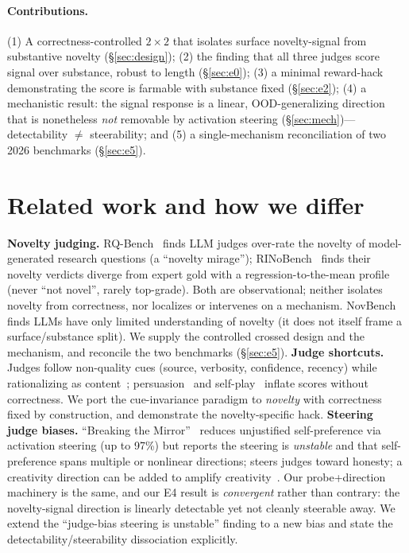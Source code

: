 \documentclass[11pt]{article}
\begin{document}
\paragraph{Contributions.} (1) A correctness-controlled $2\times2$ that isolates
surface novelty-signal from substantive novelty (\S\ref{sec:design}); (2) the
finding that all three judges score signal over substance, robust to length
(\S\ref{sec:e0}); (3) a minimal reward-hack demonstrating the score is farmable
with substance fixed (\S\ref{sec:e2}); (4) a mechanistic result: the signal
response is a linear, OOD-generalizing direction that is nonetheless \emph{not}
removable by activation steering (\S\ref{sec:mech})---detectability $\neq$
steerability; and (5) a single-mechanism reconciliation of two 2026 benchmarks
(\S\ref{sec:e5}).

\section{Related work and how we differ}
\textbf{Novelty judging.} RQ-Bench~\cite{rqbench} finds LLM judges over-rate the
novelty of model-generated research questions (a ``novelty mirage'');
RINoBench~\cite{rinobench} finds their novelty verdicts diverge from expert gold
with a regression-to-the-mean profile (never ``not novel'', rarely top-grade).
Both are observational; neither isolates novelty from correctness, nor localizes
or intervenes on a mechanism. NovBench~\cite{novbench} finds LLMs have only
limited understanding of novelty (it does not itself frame a surface/substance
split). We supply the controlled crossed design and
the mechanism, and reconcile the two benchmarks (\S\ref{sec:e5}).
\textbf{Judge shortcuts.} Judges follow non-quality cues (source, verbosity,
confidence, recency) while rationalizing as content~\cite{faithfab,silentjudge};
persuasion~\cite{trickgrader} and self-play~\cite{moreconvincing} inflate scores
without correctness. We port the cue-invariance paradigm to \emph{novelty} with
correctness fixed by construction, and demonstrate the novelty-specific hack.
\textbf{Steering judge biases.} ``Breaking the Mirror''~\cite{mirror} reduces
unjustified self-preference via activation steering (up to 97\%) but reports the
steering is \emph{unstable} and that self-preference spans multiple or nonlinear
directions; \cite{honeststeer} steers judges toward honesty; a creativity direction
can be added to amplify creativity~\cite{creativity}. Our probe+direction machinery
is the same, and our E4 result is \emph{convergent} rather than contrary: the
novelty-signal direction is linearly detectable yet not cleanly steerable away. We
extend the ``judge-bias steering is unstable'' finding to a new bias and state the
detectability/steerability dissociation explicitly.
\end{document}
